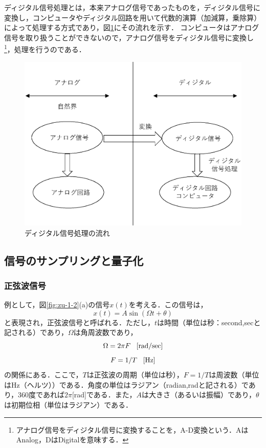 ディジタル信号処理とは，本来アナログ信号であったものを，ディジタル信号に変換し，コンピュータやディジタル回路を用いて代数的演算（加減算，乗除算）によって処理する方式であり，図\ref{fig:zu-1-1}にその流れを示す．
%
コンピュータはアナログ信号を取り扱うことができないので，アナログ信号をディジタル信号に変換し\footnote{アナログ信号をディジタル信号に変換することを，A-D変換という．AはAnalog，DはDigitalを意味する．}，処理を行うのである．

\begin{figure}[H]
\begin{center}
\includegraphics[width=.7\textwidth]{fig/zu-1-1.eps}
\end{center}
\caption{ディジタル信号処理の流れ}
\label{fig:zu-1-1}
\end{figure}


\subsection{信号のサンプリングと量子化}

\subsubsection{正弦波信号}

例として，図\ref{fig:zu-1-2}(a)の信号$x(t)$を考える．この信号は，
\begin{equation}
x(t)=A \sin (\Omega t + \theta)
\label{eqn:eqn-1-1}
\end{equation}
と表現され，正弦波信号と呼ばれる．ただし，$t$は時間（単位は秒：second,secと記される）であり，$\Omega$は角周波数であり，
\begin{equation}
\Omega = 2\pi F \hspace{3mm} \mathrm{[rad / sec]}
\end{equation}
\begin{equation}
F=1/T \hspace{3mm} \mathrm{[Hz]}
\end{equation}
の関係にある．ここで，$T$は正弦波の周期（単位は秒），$F=1/T$は周波数（単位はHz（ヘルツ））である．角度の単位はラジアン（radian,radと記される）であり，360度であれば$2\pi$[rad]である．また，$A$は大きさ（あるいは振幅）であり，$\theta$は初期位相（単位はラジアン）である．


